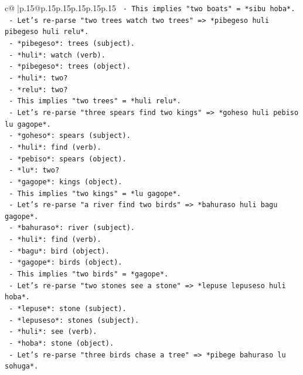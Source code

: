 \documentclass{article}
\begin{document}
{\begin{supertabular}{c@{$\;$}|p{.15\linewidth}@{}p{.15\linewidth}p{.15\linewidth}p{.15\linewidth}p{.15\linewidth}p{.15\linewidth}}
{{{\texttt{      {-} This implies "two boats" = *sibu hoba*.} \\
\texttt{    {-} Let's re{-}parse "two trees watch two trees" => *pibegeso huli pibegeso huli relu*.} \\
\texttt{      {-} *pibegeso*: trees (subject).} \\
\texttt{      {-} *huli*: watch (verb).} \\
\texttt{      {-} *pibegeso*: trees (object).} \\
\texttt{      {-} *huli*: two?} \\
\texttt{      {-} *relu*: two?} \\
\texttt{      {-} This implies "two trees" = *huli relu*.} \\
\texttt{    {-} Let's re{-}parse "three spears find two kings" => *goheso huli pebiso lu gagope*.} \\
\texttt{      {-} *goheso*: spears (subject).} \\
\texttt{      {-} *huli*: find (verb).} \\
\texttt{      {-} *pebiso*: spears (object).} \\
\texttt{      {-} *lu*: two?} \\
\texttt{      {-} *gagope*: kings (object).} \\
\texttt{      {-} This implies "two kings" = *lu gagope*.} \\
\texttt{    {-} Let's re{-}parse "a river find two birds" => *bahuraso huli bagu gagope*.} \\
\texttt{      {-} *bahuraso*: river (subject).} \\
\texttt{      {-} *huli*: find (verb).} \\
\texttt{      {-} *bagu*: bird (object).} \\
\texttt{      {-} *gagope*: birds (object).} \\
\texttt{      {-} This implies "two birds" = *gagope*.} \\
\texttt{    {-} Let's re{-}parse "two stones see a stone" => *lepuse lepuseso huli hoba*.} \\
\texttt{      {-} *lepuse*: stone (subject).} \\
\texttt{      {-} *lepuseso*: stones (subject).} \\
\texttt{      {-} *huli*: see (verb).} \\
\texttt{      {-} *hoba*: stone (object).} \\
\texttt{    {-} Let's re{-}parse "three birds chase a tree" => *pibege bahuraso lu sohuga*.} \\
}}}
\end{supertabular}}
\end{document}

